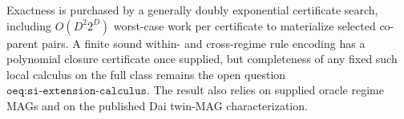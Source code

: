 Exactness is purchased by a generally doubly exponential certificate search, including \(O(D^2 2^D)\) worst-case work per certificate to materialize selected co-parent pairs.  A finite sound within- and cross-regime rule encoding has a polynomial closure certificate once supplied, but completeness of any fixed such local calculus on the full class remains the open question \(\texttt{oeq:si-extension-calculus}\).  The result also relies on supplied oracle regime MAGs and on the published Dai twin-MAG characterization.